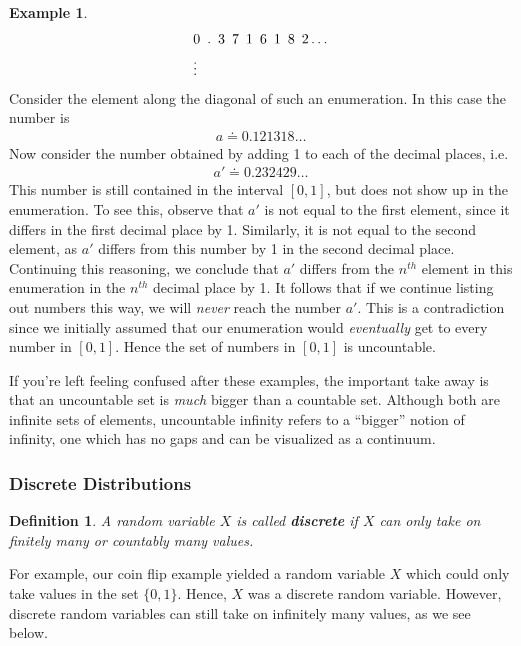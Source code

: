 \documentclass[11pt,letterpaper]{article}
\numberwithin{theorem}{section}
\newtheorem{definition}[theorem]{Definition}
\numberwithin{definition}{section}
\numberwithin{lemma}{section}
\numberwithin{corollary}{section}
\numberwithin{proposition}{section}
\theoremstyle{definition}
\numberwithin{remark}{section}
\numberwithin{claim}{section}
\numberwithin{observation}{section}
\numberwithin{fact}{section}
\numberwithin{assumption}{section}
\newtheorem{example}[theorem]{Example}
\numberwithin{example}{section}
\numberwithin{exercise}{section}
\begin{document}
\begin{example}
\begin{align*}
&0 \hspace{.5em}.\hspace{.5em}3\hspace{.5em} 7\hspace{.5em} 1\hspace{.5em} 6 \hspace{.5em}1\hspace{.5em} 8\hspace{.5em} 2 \dots \\
&\vdots
\end{align*}
Consider the element along the diagonal of such an enumeration. In this case the number is
\begin{align*}
a \doteq 0.121318\dots
\end{align*}
Now consider the number obtained by adding 1 to each of the decimal places, i.e.
\begin{align*}
a' \doteq 0.232429\dots
\end{align*}
This number is still contained in the interval $[0,1]$, but does not show up in the enumeration. To see this, observe that $a'$ is not equal to the first element, since it differs in the first decimal place by 1. Similarly, it is not equal to the second element, as $a'$ differs from this number by 1 in the second decimal place. Continuing this reasoning, we conclude that $a'$ differs from the $n^{th}$ element in this enumeration in the $n^{th}$ decimal place by 1. It follows that if we continue listing out numbers this way, we will \textit{never} reach the number $a'$. This is a contradiction since we initially assumed that our enumeration would \textit{eventually} get to every number in $[0,1]$. Hence the set of numbers in $[0,1]$ is uncountable.
\end{example}

If you're left feeling confused after these examples, the important take away is that an uncountable set is \textit{much} bigger than a countable set. Although both are infinite sets of elements, uncountable infinity refers to a ``bigger'' notion of infinity, one which has no gaps and can be visualized as a continuum.

\subsubsection{Discrete Distributions}
\begin{definition}
A random variable $X$ is called \textbf{discrete} if $X$ can only take on finitely many or countably many values.
\end{definition}
For example, our coin flip example yielded a random variable $X$ which could only take values in the set $\{0,1\}$. Hence, $X$ was a discrete random variable. However, discrete random variables can still take on infinitely many values, as we see below.
\end{document}
